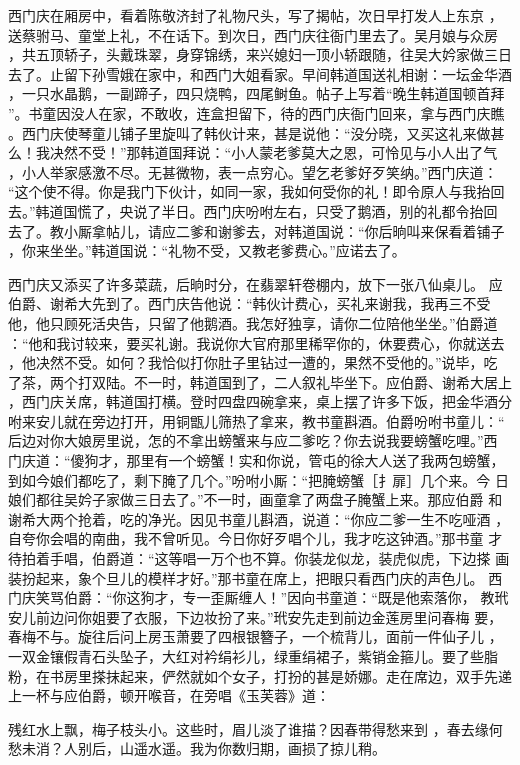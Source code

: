 西门庆在厢房中，看着陈敬济封了礼物尺头，写了揭帖，次日早打发人上东京
，送蔡驸马、童堂上礼，不在话下。到次日，西门庆往衙门里去了。吴月娘与众房
，共五顶轿子，头戴珠翠，身穿锦绣，来兴媳妇一顶小轿跟随，往吴大妗家做三日
去了。止留下孙雪娥在家中，和西门大姐看家。早间韩道国送礼相谢：一坛金华酒
，一只水晶鹅，一副蹄子，四只烧鸭，四尾鲥鱼。帖子上写着“晚生韩道国顿首拜
”。书童因没人在家，不敢收，连盒担留下，待的西门庆衙门回来，拿与西门庆瞧
。西门庆使琴童儿铺子里旋叫了韩伙计来，甚是说他：“没分晓，又买这礼来做甚
么！我决然不受！”那韩道国拜说：“小人蒙老爹莫大之恩，可怜见与小人出了气
，小人举家感激不尽。无甚微物，表一点穷心。望乞老爹好歹笑纳。”西门庆道：
“这个使不得。你是我门下伙计，如同一家，我如何受你的礼！即令原人与我抬回
去。”韩道国慌了，央说了半日。西门庆吩咐左右，只受了鹅酒，别的礼都令抬回
去了。教小厮拿帖儿，请应二爹和谢爹去，对韩道国说：“你后晌叫来保看着铺子
，你来坐坐。”韩道国说：“礼物不受，又教老爹费心。”应诺去了。

西门庆又添买了许多菜蔬，后晌时分，在翡翠轩卷棚内，放下一张八仙桌儿。
应伯爵、谢希大先到了。西门庆告他说：“韩伙计费心，买礼来谢我，我再三不受
他，他只顾死活央告，只留了他鹅酒。我怎好独享，请你二位陪他坐坐。”伯爵道
：“他和我讨较来，要买礼谢。我说你大官府那里稀罕你的，休要费心，你就送去
，他决然不受。如何？我恰似打你肚子里钻过一遭的，果然不受他的。”说毕，吃
了茶，两个打双陆。不一时，韩道国到了，二人叙礼毕坐下。应伯爵、谢希大居上
，西门庆关席，韩道国打横。登时四盘四碗拿来，桌上摆了许多下饭，把金华酒分
咐来安儿就在旁边打开，用铜甑儿筛热了拿来，教书童斟酒。伯爵吩咐书童儿：“
后边对你大娘房里说，怎的不拿出螃蟹来与应二爹吃？你去说我要螃蟹吃哩。”西
门庆道：“傻狗才，那里有一个螃蟹！实和你说，管屯的徐大人送了我两包螃蟹，
到如今娘们都吃了，剩下腌了几个。”吩咐小厮：“把腌螃蟹［扌扉］几个来。今
日娘们都往吴妗子家做三日去了。”不一时，画童拿了两盘子腌蟹上来。那应伯爵
和谢希大两个抢着，吃的净光。因见书童儿斟酒，说道：“你应二爹一生不吃哑酒
，自夸你会唱的南曲，我不曾听见。今日你好歹唱个儿，我才吃这钟酒。”那书童
才待拍着手唱，伯爵道：“这等唱一万个也不算。你装龙似龙，装虎似虎，下边搽
画装扮起来，象个旦儿的模样才好。”那书童在席上，把眼只看西门庆的声色儿。
西门庆笑骂伯爵：“你这狗才，专一歪厮缠人！”因向书童道：“既是他索落你，
教玳安儿前边问你姐要了衣服，下边妆扮了来。”玳安先走到前边金莲房里问春梅
要，春梅不与。旋往后问上房玉萧要了四根银簪子，一个梳背儿，面前一件仙子儿
，一双金镶假青石头坠子，大红对衿绢衫儿，绿重绢裙子，紫销金箍儿。要了些脂
粉，在书房里搽抹起来，俨然就如个女子，打扮的甚是娇娜。走在席边，双手先递
上一杯与应伯爵，顿开喉音，在旁唱《玉芙蓉》道：

残红水上飘，梅子枝头小。这些时，眉儿淡了谁描？因春带得愁来到
，春去缘何愁未消？人别后，山遥水遥。我为你数归期，画损了掠儿稍。


